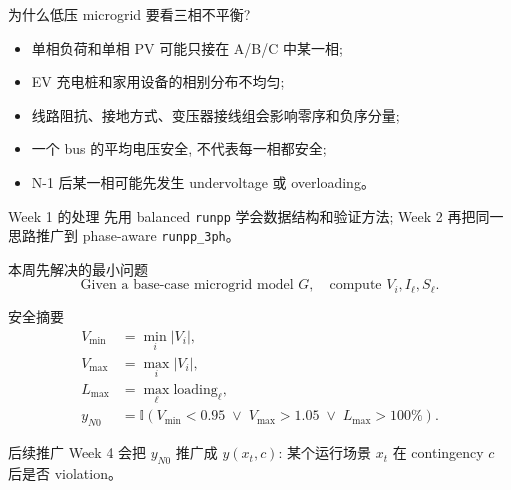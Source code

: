 \documentclass[aspectratio=169,10pt]{ctexbeamer}
\newcommand{\code}[1]{\texttt{#1}}
\begin{document}
\begin{frame}{为什么低压 microgrid 要看三相不平衡?}
\begin{itemize}
  \item 单相负荷和单相 PV 可能只接在 A/B/C 中某一相;
  \item EV 充电桩和家用设备的相别分布不均匀;
  \item 线路阻抗、接地方式、变压器接线组会影响零序和负序分量;
  \item 一个 bus 的平均电压安全, 不代表每一相都安全;
  \item N-1 后某一相可能先发生 undervoltage 或 overloading。
\end{itemize}
\begin{block}{Week 1 的处理}
先用 balanced \code{runpp} 学会数据结构和验证方法; Week 2 再把同一思路推广到 phase-aware \code{runpp\_3ph}。
\end{block}
\end{frame}

\begin{frame}{本周先解决的最小问题}
\begin{equation*}
\text{Given a base-case microgrid model } G, \quad \text{compute } V_i, I_\ell, S_\ell.
\end{equation*}
\begin{block}{安全摘要}
\begin{align*}
V_{\min} &= \min_i |V_i|, \\
V_{\max} &= \max_i |V_i|, \\
L_{\max} &= \max_\ell \text{loading}_\ell, \\
y_{N0} &= \mathbb{I}\left(V_{\min}<0.95 \;\vee\; V_{\max}>1.05 \;\vee\; L_{\max}>100\%\right).
\end{align*}
\end{block}
\begin{alertblock}{后续推广}
Week 4 会把 $y_{N0}$ 推广成 $y(x_t,c)$: 某个运行场景 $x_t$ 在 contingency $c$ 后是否 violation。
\end{alertblock}
\end{frame}
\end{document}
